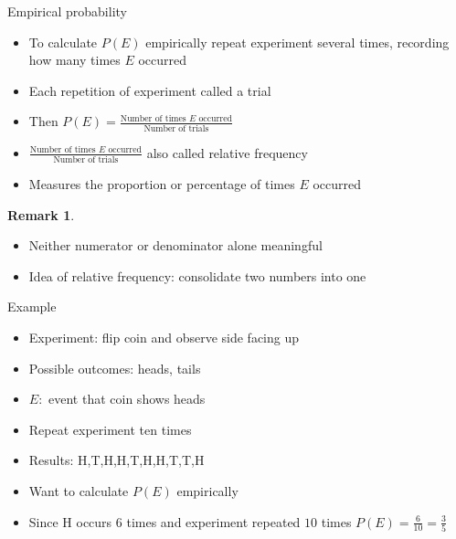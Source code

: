 \documentclass{beamer}
\theoremstyle{definition}
\newtheorem{remark}{Remark}
\begin{document}
\begin{frame}{Empirical probability}
\begin{itemize}
\item To calculate $P\left(E\right)$ \alert{empirically}
repeat experiment several times, recording how
many times $E$ occurred
\item Each repetition of experiment called a \alert{trial}
\item Then $P\left(E\right)=
\frac{\text{Number of times $E$ occurred}}
{\text{Number of trials}}$
\item $\frac{\text{Number of times $E$ occurred}}
{\text{Number of trials}}$ also called
\alert{relative frequency}
\item Measures the \alert{proportion} or \alert{percentage}
of times $E$ occurred
\end{itemize}
\begin{remark}
\begin{itemize}
\item Neither numerator or denominator alone meaningful
\item Idea of relative frequency: consolidate two numbers into one
\end{itemize}
\end{remark}
\end{frame}

\begin{frame}{Example}
\begin{itemize}
\item Experiment: flip coin and observe side facing up
\item Possible outcomes: heads, tails
\item $E:$ event that coin shows heads
\item Repeat experiment ten times
\item Results: H,T,H,H,T,H,H,T,T,H
\item Want to calculate $P\left(E\right)$ empirically
\item Since H occurs $6$ times
and experiment repeated $10$ times
$P\left(E\right)=\frac{6}{10}=\frac{3}{5}$
\end{itemize}
\end{frame}
\end{document}
